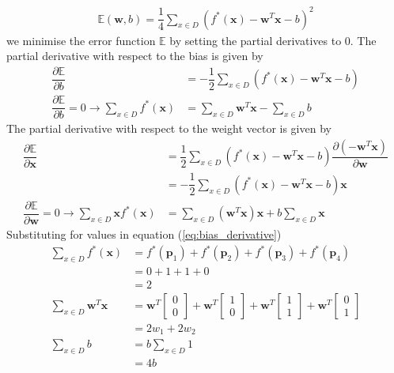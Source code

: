 \begin{align}
  \label{eq:error_XOR_prob}
  \mathbb{E}(\textbf{w},b) = \dfrac{1}{4} \sum_{x\in D}(f^{*}(\textbf{x})- \textbf{w}^T\textbf{x}-b)^2
\end{align}
we minimise the error function $\mathbb{E}$ by setting the partial derivatives to 0. The partial derivative with respect to the bias is given by
\begin{align}
  \nonumber
  \dfrac{\partial \mathbb{E}}{\partial b} &= -\dfrac{1}{2} \sum_{x\in D}(f^{*}(\textbf{x})- \textbf{w}^T\textbf{x}-b)\\
  \label{eq:bias_derivative}
  \dfrac{\partial \mathbb{E}}{\partial b} = 0\rightarrow \sum_{x\in D}f^{*}(\textbf{x}) &= \sum_{x\in D}\textbf{w}^T\textbf{x}- \sum_{x\in D}b
\end{align}
The partial derivative with respect to the weight vector is given by
\begin{align}
  \nonumber
  \dfrac{\partial \mathbb{E}}{\partial \textbf{x}} &= \dfrac{1}{2} \sum_{x\in D}(f^{*}(\textbf{x})- \textbf{w}^T\textbf{x}-b) \dfrac{\partial (-\textbf{w}^T\textbf{x})}{\partial \textbf{w}}\\
  \nonumber
  &=-\dfrac{1}{2} \sum_{x\in D}(f^{*}(\textbf{x})- \textbf{w}^T\textbf{x}-b)\textbf{x}\\
  \label{eq:weight_derivative}
  \dfrac{\partial \mathbb{E}}{\partial \textbf{w}} = 0\rightarrow \sum_{x\in D}\textbf{x}f^{*}(\textbf{x}) &= \sum_{x\in D}(\textbf{w}^T\textbf{x})\textbf{x} + b\sum_{x\in D}\textbf{x}
\end{align}
Substituting for values in equation (\ref{eq:bias_derivative})
\begin{align}
  \sum_{x\in D}f^{*}(\textbf{x}) &= f^{*}(\textbf{p}_1) + f^{*}(\textbf{p}_2) + f^{*}(\textbf{p}_3) + f^{*}(\textbf{p}_4) \nonumber \\
  &= 0+1+1+0 \nonumber \\
  & = 2 \\
  \sum_{x\in D}\textbf{w}^T\textbf{x} &= \textbf{w}^T\begin{bmatrix}
    0 \\
    0
  \end{bmatrix} + \textbf{w}^T\begin{bmatrix}
    1 \\
    0
  \end{bmatrix} + \textbf{w}^T\begin{bmatrix}
    1 \\
    1
  \end{bmatrix}+ \textbf{w}^T\begin{bmatrix}
    0 \\
    1
  \end{bmatrix} \nonumber \\
  &= 2w_1 + 2w_2 \\
  \nonumber
  \sum_{x\in D}b &= b \sum_{x\in D} 1 \\&= 4b
\end{align}
